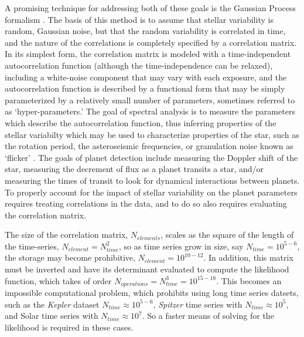 \documentclass[manuscript, letterpaper]{aastex6}
\begin{document}
A promising technique for addressing both of these goals is the Gaussian Process formalism
\citep{Rasmussen2006,Gibson2012}.  The basis of this method is to assume that stellar variability
is random, Gaussian noise, but that the random variability is correlated in time, and the nature of the
correlations is completely specified by a correlation matrix.  In its simplest form, the
correlation matrix is modeled with a time-independent autocorrelation function (although
the time-independence can be relaxed), including a white-noise component that may vary
with each exposure, and the autocorrelation function is described by a functional form that may be
simply parameterized by a relatively small number of parameters, sometimes referred to as
`hyper-parameters.'  The goal of spectral analysis is to measure the parameters which
describe the autocorrelation function, thus inferring properties of the stellar variabilty
which may be used to characterize properties of the star, such as the rotation period,
the asteroseismic frequencies, or granulation noise known as `flicker' \citep{Aerts2010,Noyes1984,Bastien2013}.
The goals of planet detection include measuring the Doppler shift of the star, measuring
the decrement of flux as a planet transits a star, and/or measuring the times of transit to
look for dynamical interactions between planets.  To properly account for the impact of
stellar variability on the planet parameters requires treating correlations in the data, and
to do so also requires evaluating the correlation matrix.

The size of the correlation matrix, $N_{elements}$, scales as the square of the length of the time-series,
$N_{element}=N_{time}^2$, so as time series grow in size, say $N_{time} =10^{5-6}$, the storage may become
prohibitive, $N_{element} = 10^{10-12}$.  In addition, this matrix must be inverted and have
its determinant evaluated to compute the likelihood function, which takes of order $N_{operations}
= N_{time}^3 = 10^{15-18}$.  This becomes an impossible computational problem, which prohibits
using long time series datsets, such as the {\it Kepler} dataset $N_{time} \approx 10^{5-6}$,
{\it Spitzer} time series with $N_{time} \approx 10^5$, and Solar time series with
$N_{time} \approx 10^7$.  So a faster means of solving for the likelihood is required in these
cases.
\end{document}
